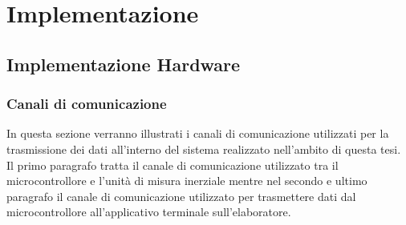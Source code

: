 \chapter{Implementazione}
\label{implementazione}

\section{Implementazione Hardware}



\subsection{Canali di comunicazione}
In questa sezione verranno illustrati i canali di comunicazione utilizzati per la trasmissione dei dati all'interno del sistema realizzato nell'ambito di questa tesi. Il primo paragrafo tratta il canale di comunicazione utilizzato tra il microcontrollore e l'unità di misura inerziale mentre nel secondo e ultimo paragrafo il canale di comunicazione utilizzato per trasmettere dati dal microcontrollore all'applicativo terminale sull'elaboratore.
